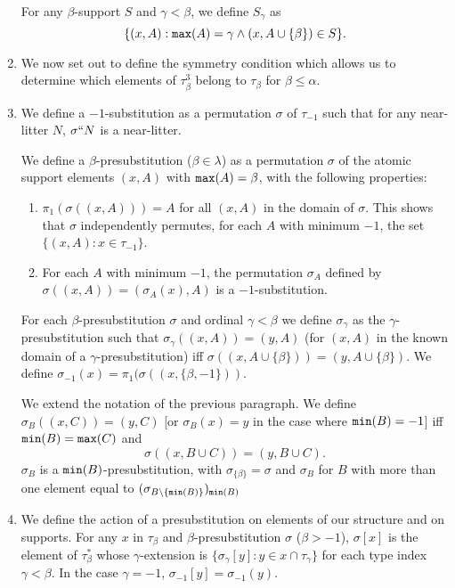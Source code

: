 \documentclass[12pt]{article}
\begin{document}
\begin{enumerate}
For any $\beta$-support $S$ and $\gamma<\beta$, we define $S_\gamma$ as $$\{(x,A):{\tt max}(A)=\gamma \wedge (x,A\cup \{\beta\}) \in S\}.$$

\item  We now set out to define the symmetry condition which allows us to determine which elements of $\tau^3_\beta$ belong to $\tau_\beta$ for $\beta\leq \alpha$.

\item We define a $-1$-substitution as a permutation $\sigma$ of $\tau_{-1}$ such that for any near-litter $N$, $\sigma``N$ is a near-litter.

We define a $\beta$-presubstitution ($\beta\in \lambda$) as a permutation $\sigma$ of the atomic support elements $(x,A)$ with ${\tt max}(A)=\beta$, with the following properties:

\begin {enumerate}

\item $\pi_1(\sigma((x,A))) = A$ for all $(x,A)$ in the domain of $\sigma$.  This shows that $\sigma$ independently permutes, for each $A$ with minimum $-1$, the set $\{(x,A):x \in \tau_{-1}\}$.

\item For each $A$ with minimum $-1$, the permutation $\sigma_A$ defined by $\sigma((x,A)) = (\sigma_A(x),A)$ is a $-1$-substitution.

\end{enumerate}

For each $\beta$-presubstitution $\sigma$ and ordinal $\gamma<\beta$ we define $\sigma_\gamma$ as the $\gamma$-presubstitution such that $\sigma_\gamma((x,A)) = (y,A)$ (for $(x,A)$ in the known domain of a $\gamma$-presubstitution) iff $\sigma((x,A \cup \{\beta\})) = (y,A \cup \{\beta\})$.
We define $\sigma_{-1}(x) = \pi_1(\sigma((x,\{\beta,-1\}))$.

We extend the notation of the previous paragraph.  We define $\sigma_B((x,C)) = (y,C)$ [or $\sigma_B(x)=y$ in the case where ${\tt min}(B)=-1$] iff ${\tt min}(B) = {\tt max}(C)$  and $$\sigma((x,B \cup C)) = (y,B \cup C).$$  $\sigma_B$ is a ${\tt min}(B)$-presubstitution, with $\sigma_{\{\beta\}} = \sigma$ and $\sigma_B$ for $B$ with more than one element
equal to $(\sigma_{B \setminus \{{\tt min}(B)\}})_{{\tt min}(B)}$

\item  We define the action of a presubstitution on elements of our structure and on supports.  For any $x$ in $\tau_\beta$ and $\beta$-presubstitution $\sigma$ ($\beta>-1$), $\sigma[x]$ is the element of $\tau^*_\beta$ whose $\gamma$-extension is $\{\sigma_\gamma[y]:y \in x \cap \tau_\gamma\}$ for each type index $\gamma<\beta$.  In
the case $\gamma=-1$, $\sigma_{-1}[y] = \sigma_{-1}(y)$.


\end{enumerate}
\end{document}
